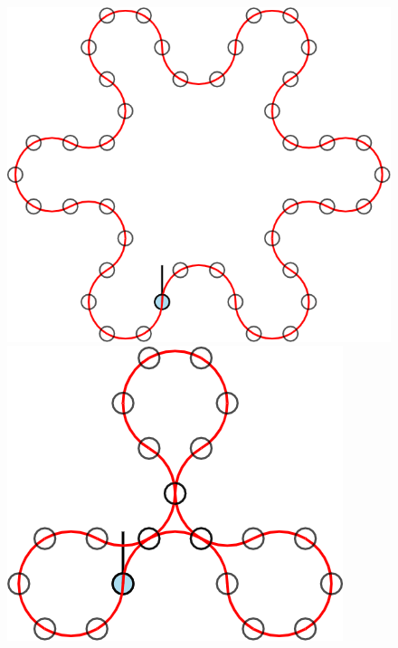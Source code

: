 \documentclass{article}
\begin{document}
\begin{figure}[ht!]
  \includegraphics[scale=0.12]{assets/069_problem_robot_walks/6-robot_3_4.png}
  \includegraphics[scale=0.12]{assets/069_problem_robot_walks/6-robot_3_5.png}

\end{figure}
\end{document}
